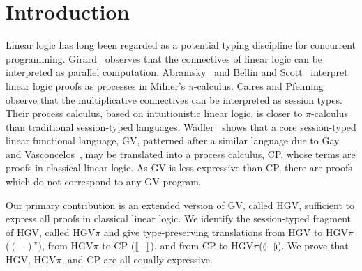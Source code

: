 \documentclass{easychair}
\newcommand{\cptogv}[1]{\llparenthesis{#1}\rrparenthesis}
\newcommand{\hgv}{HGV\xspace}
\newcommand{\hgvpi}{HGV$\pi$\xspace}
\newcommand{\lampi}[1]{({#1})^\star}
\newcommand{\hgvcp}[1]{\llbracket{#1}\rrbracket}
\begin{document}
%
%



\section{Introduction}

Linear logic has long been regarded as a potential typing discipline for concurrent programming.
Girard~\cite{Girard87} observes that the connectives of linear logic can be interpreted as parallel
computation. Abramsky~\cite{Abramsky92} and Bellin and Scott~\cite{BellinScott94} interpret linear
logic proofs as processes in Milner's $\pi$-calculus.
%
%
Caires and Pfenning~\cite{CairesPfenning10} observe that the multiplicative connectives can be
interpreted as session types. Their process calculus, based on intuitionistic linear logic, is
closer to $\pi$-calculus than traditional session-typed languages. Wadler~\cite{Wadler12} shows that
a core session-typed linear functional language, GV, patterned after a similar language due to Gay
and Vasconcelos~\cite{GayVasconcelos10}, may be translated into a process calculus, CP, whose terms
are proofs in classical linear logic.
%
%
As GV is less expressive than CP, there are proofs which do not correspond to any GV program.

Our primary contribution is an extended version of GV, called \hgv, sufficient to express all proofs
in classical linear logic.
%
We identify the session-typed fragment of \hgv, called \hgvpi and
%
give type-preserving translations from \hgv to \hgvpi ($\lampi{-}$), from \hgvpi to CP
($\hgvcp{-}$), and from CP to \hgvpi ($\cptogv{-}$).
%
%
We prove that \hgv, \hgvpi, and CP are all equally expressive.
\end{document}
